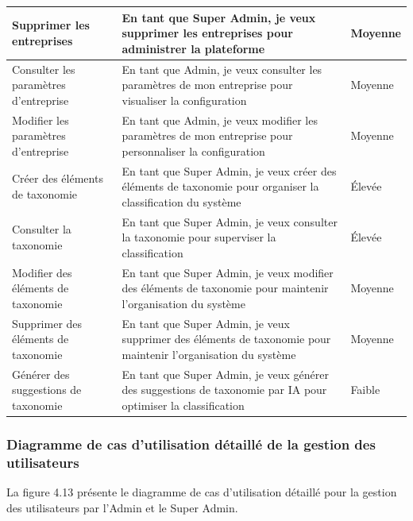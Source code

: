 \begin{longtable}{|>{\raggedright\arraybackslash}p{4cm}|>{\raggedright\arraybackslash}p{7cm}|>{\raggedright\arraybackslash}p{2cm}|}
\hline
Supprimer les entreprises & En tant que Super Admin, je veux supprimer les entreprises pour administrer la plateforme & Moyenne \\
\hline
Consulter les paramètres d'entreprise & En tant que Admin, je veux consulter les paramètres de mon entreprise pour visualiser la configuration & Moyenne \\
\hline
Modifier les paramètres d'entreprise & En tant que Admin, je veux modifier les paramètres de mon entreprise pour personnaliser la configuration & Moyenne \\
\hline
Créer des éléments de taxonomie & En tant que Super Admin, je veux créer des éléments de taxonomie pour organiser la classification du système & Élevée \\
\hline
Consulter la taxonomie & En tant que Super Admin, je veux consulter la taxonomie pour superviser la classification & Élevée \\
\hline
Modifier des éléments de taxonomie & En tant que Super Admin, je veux modifier des éléments de taxonomie pour maintenir l'organisation du système & Moyenne \\
\hline
Supprimer des éléments de taxonomie & En tant que Super Admin, je veux supprimer des éléments de taxonomie pour maintenir l'organisation du système & Moyenne \\
\hline
Générer des suggestions de taxonomie & En tant que Super Admin, je veux générer des suggestions de taxonomie par IA pour optimiser la classification & Faible \\
\hline
\end{longtable}

\subsubsection{Diagramme de cas d'utilisation détaillé de la gestion des utilisateurs}
\noindent La figure 4.13 présente le diagramme de cas d'utilisation détaillé pour la gestion des utilisateurs par l'Admin et le Super Admin.

